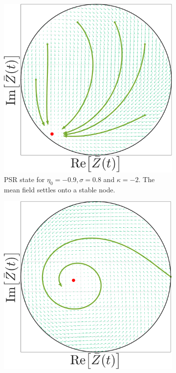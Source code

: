 \begin{figure}[H]
\centering
\begin{subfigure}[b]{0.32\linewidth}
   \centering
  \includegraphics[width=\linewidth]{../Figures/PhaseSpace/MFOARPSR_random.pdf}
   \caption{PSR state for $\eta_0 = -0.9, \sigma = 0.8$ and $\kappa= -2$. The mean field settles onto a stable node.}
   \label{fig:MFOARPSR_random} 
\end{subfigure} \hfill
\begin{subfigure}[b]{0.32\linewidth}
   \centering
  \includegraphics[width=\linewidth]{../Figures/PhaseSpace/MFOARPSS_random.pdf}

\end{subfigure}
\end{figure}
